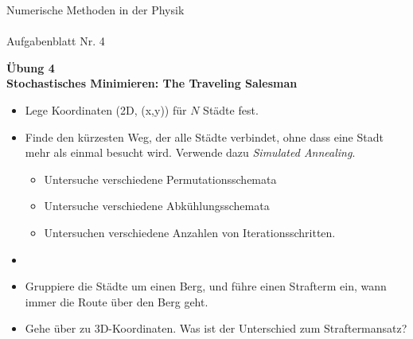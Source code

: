 \documentclass[paper=a4, fontsize=12pt]{scrartcl}
\begin{document}
\begin{center}
{\Large{Numerische Methoden in der Physik}} \\
{} \\
\vspace{5mm}
{\large{Aufgabenblatt Nr. 4}} \\
\end{center}

\vspace{5mm}

{\bf Übung 4 \\ Stochastisches Minimieren: The Traveling Salesman}
\begin {itemize}
\item Lege Koordinaten (2D, (x,y)) für $N$ Städte fest.
\item Finde den kürzesten Weg, der alle Städte verbindet, ohne dass eine Stadt mehr als einmal
besucht wird. Verwende dazu \emph{Simulated Annealing}.
\begin{itemize}
\item Untersuche verschiedene Permutationsschemata
\item Untersuche verschiedene Abkühlungsschemata
\item Untersuchen verschiedene Anzahlen von Iterationsschritten.
\end{itemize}
\item[]
\item Gruppiere die Städte um einen Berg, und führe einen Strafterm ein, wann immer die Route über
den Berg geht.
\item Gehe über zu 3D-Koordinaten. Was ist der Unterschied zum Straftermansatz?
\end{itemize}
\end{document}
